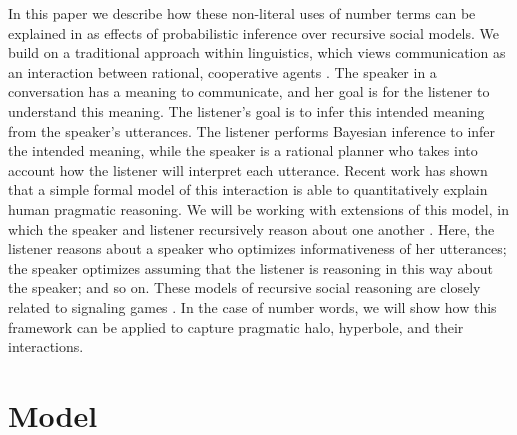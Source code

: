 \documentclass{article} %
\begin{document}
In this paper we describe how these non-literal uses of number terms can be explained in as effects of probabilistic inference over recursive social models.
We build on a traditional approach within linguistics, which views communication as an interaction between rational, cooperative agents \cite{grice1975,clark}. 
The speaker in a conversation has a meaning to communicate, and her goal is for the listener to understand this meaning. The listener's goal is to infer this intended meaning from the speaker's utterances. The listener performs Bayesian inference to infer the intended meaning, while the speaker is a rational planner who takes into account how the listener will interpret each utterance. 
Recent work \cite{frankgoodmanscience, goodmanstuhlmueller} has shown that a simple formal model of this interaction is able to quantitatively explain human pragmatic reasoning. We will be working with extensions of this model, in which the speaker and listener recursively reason about one another \cite{jager2009pragmatic, bergen2012, franke2009interpretation}. Here, the listener reasons about a speaker who optimizes informativeness of her utterances; the speaker optimizes assuming that the listener is reasoning in this way about the speaker; and so on. These models of recursive social reasoning are closely related to signaling games \cite{cho1987signaling, chen2008selecting}. In the case of number words, we will show how this framework can be applied to capture pragmatic halo, hyperbole, and their interactions.




\section{Model}
\end{document}
